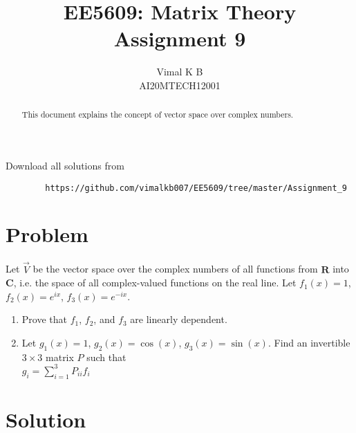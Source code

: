 \documentclass[journal,12pt,twocolumn]{IEEEtran}
\begin{document}
	\def\rightbox#1{\makebox[0in][r]{#1}}
	\def\centbox#1{\makebox[0in]{#1}}
	\def\topbox#1{\raisebox{-\baselineskip}[0in][0in]{#1}}
	\def\midbox#1{\raisebox{-0.5\baselineskip}[0in][0in]{#1}}
	\vspace{3cm}
	\title{EE5609: Matrix Theory\\
		Assignment 9\\}
	\author{Vimal K B\\
		AI20MTECH12001}
	\maketitle
	\newpage
	\bigskip
	\renewcommand{\thefigure}{\theenumi}
	\renewcommand{\thetable}{\theenumi}
	\begin{abstract}
		This document explains the concept of vector space over complex numbers.
	\end{abstract}
	Download all solutions from 
	\begin{lstlisting}
		https://github.com/vimalkb007/EE5609/tree/master/Assignment_9
	\end{lstlisting}
	\section{Problem}
	Let $\vec{V}$ be the vector space over the complex numbers of all functions from $\mathbf{R}$ into $\mathbf{C}$, i.e. the space of all complex-valued functions on the real line. Let $f_1(x) = 1$, $f_2(x) = e^{ix}$, $f_3(x) = e^{-ix}$.\\
	
	\begin{enumerate}[label=(\alph*)]
		\item Prove that $f_1$, $f_2$, and $f_3$ are linearly dependent.\\
		\item Let $g_1(x) = 1$, $g_2(x) = \cos(x)$, $g_3(x) = \sin(x)$. Find an invertible $3\times 3$ matrix $P$ such that\\
		$g_i = \sum_{i=1}^{3} P_{ii}f_i$
	\end{enumerate}
	
	\section{Solution}
	
\end{document}
